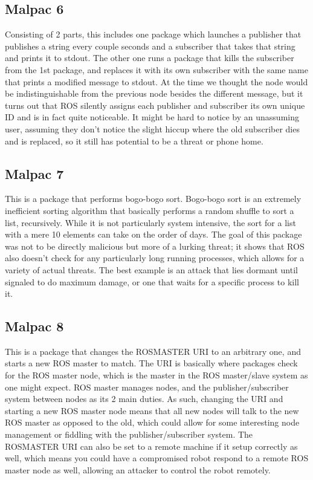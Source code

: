 \documentclass[IEEEtran,letterpaper,10pt,notitlepage,draftclsnofoot,onecolumn]{article}
\begin{document}
\subsection{Malpac 6}
Consisting of 2 parts, this includes one package which launches a publisher that publishes a string every couple seconds and a subscriber that takes that string and prints it to stdout.
The other one runs a package that kills the subscriber from the 1st package, and replaces it with its own subscriber with the same name that prints a modified message to stdout.
At the time we thought the node would be indistinguishable from the previous node besides the different message, but it turns out that ROS silently assigns each publisher and subscriber its own unique ID and is in fact quite noticeable.
It might be hard to notice by an unassuming user, assuming they don’t notice the slight hiccup where the old subscriber dies and is replaced, so it still has potential to be a threat or phone home.

\subsection{Malpac 7}
This is a package that performs bogo-bogo sort. \cite{bogo}
Bogo-bogo sort is an extremely inefficient sorting algorithm that basically performs a random shuffle to sort a list, recursively.
While it is not particularly system intensive, the sort for a list with a mere 10 elements can take on the order of days.
The goal of this package was not to be directly malicious but more of a lurking threat; it shows that ROS also doesn’t check for any particularly long running processes, which allows for a variety of actual threats.
The best example is an attack that lies dormant until signaled to do maximum damage, or one that waits for a specific process to kill it.

\subsection{Malpac 8}
This is a package that changes the ROSMASTER URI to an arbitrary one, and starts a new ROS master to match.
The URI is basically where packages check for the ROS master node, which is the master in the ROS master/slave system as one might expect.
ROS master manages nodes, and the publisher/subscriber system between nodes as its 2 main duties.
As such, changing the URI and starting a new ROS master node means that all new nodes will talk to the new ROS master as opposed to the old, which could allow for some interesting node management or fiddling with the publisher/subscriber system.
The ROSMASTER URI can also be set to a remote machine if it setup correctly as well, which means you could have a compromised robot respond to a remote ROS master node as well, allowing an attacker to control the robot remotely.
\end{document}
